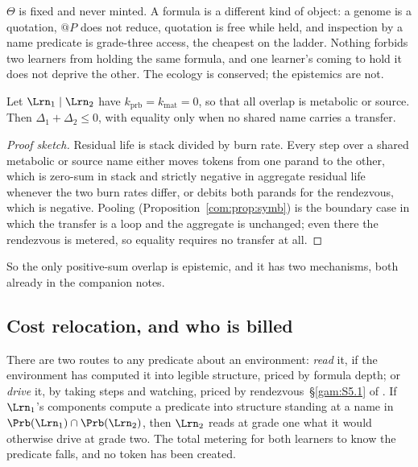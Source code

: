 \begin{observation}\label{com:obs:two}
$\Theta$ is fixed and never minted. A formula is a different kind of object: a genome is a
quotation, $@P$ does not reduce, quotation is free while held, and inspection by a name predicate
is grade-three access, the cheapest on the ladder. Nothing forbids two learners from holding the
same formula, and one learner's coming to hold it does not deprive the other. The ecology is
conserved; the epistemics are not.
\end{observation}

\begin{proposition}\label{com:prop:nomet}
Let $\Lrn_1 \mid \Lrn_2$ have $k_{\mathrm{prb}} = k_{\mathrm{mat}} = 0$, so that all overlap is
metabolic or source. Then $\Delta_1 + \Delta_2 \leq 0$, with equality only when no shared name
carries a transfer.
\end{proposition}

\begin{proof}[Proof sketch]
Residual life is stack divided by burn rate. Every step over a shared metabolic or source name
either moves tokens from one parand to the other, which is zero-sum in stack and strictly
negative in aggregate residual life whenever the two burn rates differ, or debits both parands
for the rendezvous, which is negative. Pooling (Proposition~\ref{com:prop:symb}) is the boundary case
in which the transfer is a loop and the aggregate is unchanged; even there the rendezvous is
metered, so equality requires no transfer at all.
\end{proof}

So the only positive-sum overlap is epistemic, and it has two mechanisms, both already in the
companion notes.

\subsection{Cost relocation, and who is billed}\label{com:S6.2}

\begin{observation}\label{com:obs:amort}
There are two routes to any predicate about an environment: \emph{read} it, if the environment
has computed it into legible structure, priced by formula depth; or \emph{drive} it, by taking
steps and watching, priced by rendezvous~\S\ref{gam:S5.1} of \chGame. If $\Lrn_1$'s components compute a
predicate into structure standing at a name in $\Prb(\Lrn_1) \cap \Prb(\Lrn_2)$, then $\Lrn_2$
reads at grade one what it would otherwise drive at grade two. The total metering for both
learners to know the predicate falls, and no token has been created.
\end{observation}

